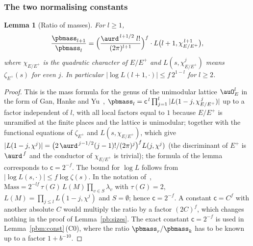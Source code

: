 \documentclass[10pt]{amsart}
\newtheorem{lemma}[theorem]{Lemma}
\theoremstyle{definition}
\theoremstyle{remark}
\begin{document}
\subsubsection*{The two normalising constants}

\begin{lemma}[Ratio of masses]\label{pb:massratio}
For $l\ge1$,
\[
\frac{\pbmass_{l+1}}{\pbmass_l}=\Bigl(\frac{\aurd^{\,l+1/2}\;l!}{(2\pi)^{l+1}}\Bigr)^{f}\cdot L\bigl(
l+1,\chi_{E/E^+}^{\,l+1}\bigr),
\]
where $\chi_{E/E^+}$ is the quadratic character of $E/E^+$ and $L(s,\chi^j_{E/E^+})$ means
$\zeta_{E^+}(s)$ for even $j$. In particular $\bigl|\log L(l+1,\cdot)\bigr|\le f\,2^{1-l}$ for
$l\ge2$.
\end{lemma}
\begin{proof}
This is the mass formula for the genus of the unimodular lattice $\auO_E^l$ in the form of
Gan, Hanke and Yu~\cite[Propositions~4.4 and 4.5]{GHY}, $\pbmass_l=\mathsf c^{\,l}\prod_{j=1}^l|L(1-j,\chi_{E/E^+}^{\,j})|$
up to a factor independent of $l$, with all local factors equal to $1$ because $E/E^+$ is
unramified at the finite places and the lattice is unimodular; together with the functional
equations of $\zeta_{E^+}$ and $L(s,\chi_{E/E^+})$, which give $|L(1-j,\chi^j)|=\bigl(2\,\aurd^{\,j-
1/2}(j-1)!/(2\pi)^j\bigr)^f L(j,\chi^j)$ (the discriminant of $E^+$ is $\aurd^{\,f}$ and the
conductor of $\chi_{E/E^+}$ is trivial); the formula of the lemma corresponds to $\mathsf c=2^{-f}$.
The bound for $\log L$ follows from $|\log L(s,\cdot)|\le f\log\zeta(s)$. In the notation of~\cite[(4.2), (4.3), Propositions~4.4--4.5]{GHY},
$\mathrm{Mass}=2^{-lf}\,\tau(G)\,L(M)\prod_{v\in S}\lambda_v$ with $\tau(G)=2$, $L(M)=\prod_{j\le l}L(1-j,\chi^j)$ and $S=\emptyset$; hence $\mathsf c=2^{-f}$. A constant $\mathsf c=C^f$ with another
absolute $C$ would multiply the ratio by a factor $(2C)^f$, which changes nothing in the proof of Lemma~\ref{pb:sizes}. The exact constant $\mathsf c=2^{-f}$ is used in Lemma~\ref{pbm:const}\,\textup{(C0)}, where the ratio $\pbmass_r/\pbmass_k$ has to be known up to a factor $1+b^{-10}$.
\end{proof}
\end{document}
